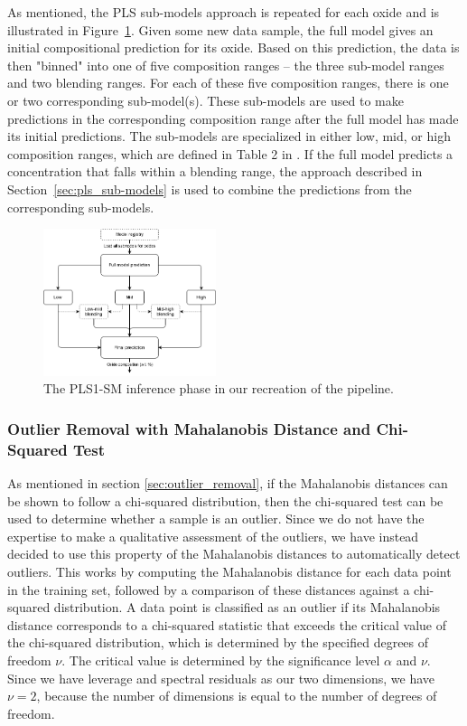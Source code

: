 As mentioned, the PLS sub-models approach is repeated for each oxide and is illustrated in Figure~\ref{fig:pls_inference}.
Given some new data sample, the full model gives an initial compositional prediction for its oxide.
Based on this prediction, the data is then "binned" into one of five composition ranges -- the three sub-model ranges and two blending ranges.
For each of these five composition ranges, there is one or two corresponding sub-model(s).
These sub-models are used to make predictions in the corresponding composition range after the full model has made its initial predictions.
The sub-models are specialized in either low, mid, or high composition ranges, which are defined in Table 2 in \citet{andersonImprovedAccuracyQuantitative2017}.
If the full model predicts a concentration that falls within a blending range, the approach described in Section~\ref{sec:pls_sub-models} is used to combine the predictions from the corresponding sub-models.

\begin{figure}
	\centering
	\includegraphics[width=0.45\textwidth]{images/pls_inference.png}
	\caption{The PLS1-SM inference phase in our recreation of the pipeline.}
	\label{fig:pls_inference}
\end{figure}

\subsubsection{Outlier Removal with Mahalanobis Distance and Chi-Squared Test}\label{sec:methodology_outlier_removal}
As mentioned in section \ref{sec:outlier_removal}, if the Mahalanobis distances can be shown to follow a chi-squared distribution, then the chi-squared test can be used to determine whether a sample is an outlier.
Since we do not have the expertise to make a qualitative assessment of the outliers, we have instead decided to use this property of the Mahalanobis distances to automatically detect outliers.
This works by computing the Mahalanobis distance for each data point in the training set, followed by a comparison of these distances against a chi-squared distribution.
A data point is classified as an outlier if its Mahalanobis distance corresponds to a chi-squared statistic that exceeds the critical value of the chi-squared distribution, which is determined by the specified degrees of freedom $\nu$.
The critical value is determined by the significance level $\alpha$ and $\nu$.
Since we have leverage and spectral residuals as our two dimensions, we have $\nu = 2$, because the number of dimensions is equal to the number of degrees of freedom\cite{aggarwal_outlier_2017}.

